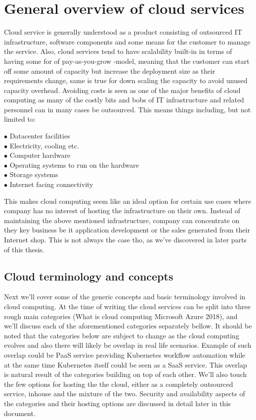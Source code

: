 \documentclass{article}
\begin{document}
\section{General overview of cloud services}
Cloud service is generally understood as a product consisting of outsourced IT infrastructure, software components and some means for the customer to manage the service. Also, cloud services tend to have scalability built-in in terms of having some for of pay-as-you-grow -model, meaning that the customer can start off some amount of capacity but increase the deployment size as their requirements change, same is true for down scaling the capacity to avoid unused capacity overhead.
Avoiding costs is seen as one of the major benefits of cloud computing as many of the costly bits and bobs of IT infrastructure and related personnel can in many cases be outsourced. This means things including, but not limited to:
\begin{description}
	\item[$\bullet$ Datacenter facilities]
	\item[$\bullet$ Electricity, cooling etc.]
	\item[$\bullet$ Computer hardware]
	\item[$\bullet$ Operating systems to run on the hardware]
	\item[$\bullet$ Storage systems]
	\item[$\bullet$ Internet facing connectivity]
\end{description}
This makes cloud computing seem like an ideal option for certain use cases where company has no interest of hosting the infrastructure on their own. Instead of maintaining the above mentioned infrastructure, company can concentrate on they key business be it application development or the sales generated from their Internet shop. This is not always the case tho, as we've discovered in later parts of this thesis.
\subsection{Cloud terminology and concepts}
Next we'll cover some of the generic concepts and basic terminology involved in cloud computing.
At the time of writing the cloud services can be split into three rough main categories (What is cloud computing Microsoft Azure 2018), and we'll discuss each of the aforementioned categories separately bellow. It should be noted that the categories below are subject to change as the cloud computing evolves and also there will likely be overlap in real life scenarios. Example of such overlap could be PaaS service providing Kubernetes workflow automation while at the same time Kubernetes itself could be seen as a SaaS service.
This overlap is natural result of the categories building on top of each other.
We'll also touch the few options for hosting the the cloud, either as a completely outsourced service, inhouse and the mixture of the two.
Security and availability aspects of the categories and their hosting options are discussed in detail later in this document. 
\end{document}
